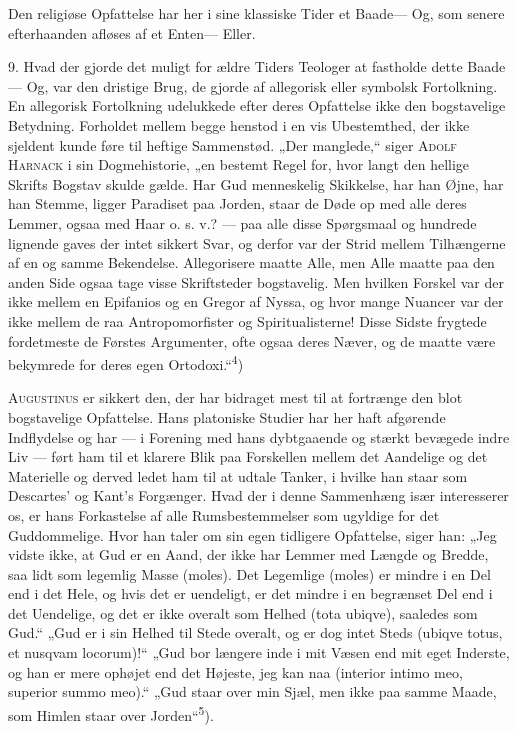 \documentclass[12pt,a4paper,openany]{book}
\newcommand{\opage}[1]{\marginnote{\footnotesize\textit{[#1]}}}
\begin{document}
Den religiøse Opfattelse har her i sine klassiske Tider et Baade--- Og,
som senere efterhaanden afløses af et Enten--- Eller.

9. Hvad der gjorde det muligt for ældre Tiders Teologer at fastholde
dette Baade--- Og, var den dristige Brug, de gjorde af allegorisk eller
symbolsk Fortolkning. En allegorisk Fortolkning udelukkede efter deres
Opfattelse ikke den bogstavelige Betydning. Forholdet mellem begge
henstod i en vis Ubestemthed, der ikke sjeldent kunde føre til heftige
Sammenstød. „Der manglede,“ siger \textsc{Adolf Harnack} i sin
Dogmehistorie, „en bestemt Regel for, hvor langt den hellige Skrifts
Bogstav skulde gælde. Har Gud menneskelig Skikkelse, har han Øjne, har
han Stemme, ligger Paradiset paa Jorden, staar de Døde op med alle deres
Lemmer, ogsaa med Haar o. s. v.? --- paa alle disse Spørgsmaal og
hundrede lignende gaves der intet sikkert Svar, og derfor var der Strid
mellem Tilhængerne af en og samme Bekendelse. Allegorisere maatte Alle,
men Alle maatte paa den anden Side ogsaa tage visse Skriftsteder
bogstavelig. Men hvilken Forskel var der ikke mellem en Epifanios og en
Gregor af Nyssa, og hvor mange Nuancer var der ikke mellem de raa
Antropomorfister og Spiritualisterne! Disse Sidste frygtede fordetmeste
de Førstes Argumenter, ofte ogsaa deres Næver, og de maatte være
bekymrede for deres egen Ortodoxi.“\textsuperscript{4})

\textsc{Augustinus} er sikkert den, der har bidraget mest til at
fortrænge den blot bogstavelige Opfattelse. Hans platoniske Studier har
her haft afgørende Indflydelse og har --- i Forening med hans
dybtgaaende og stærkt bevægede indre Liv --- ført ham til et klarere
Blik paa Forskellen mellem det Aandelige og det Materielle og derved
ledet ham til at udtale Tanker, i hvilke han staar som Descartes’ og
Kant’s Forgænger. Hvad der i denne Sammenhæng især interesserer os, er
hans Forkastelse af alle Rumsbestemmelser som ugyldige for det
Guddommelige. Hvor han taler om sin egen
\opage{27}tidligere Opfattelse, siger han: „Jeg vidste ikke, at Gud er
en Aand, der ikke har Lemmer med Længde og Bredde, saa lidt som legemlig
Masse (moles). Det Legemlige (moles) er mindre i en Del end i det Hele,
og hvis det er uendeligt, er det mindre i en begrænset Del end i det
Uendelige, og det er ikke overalt som Helhed (tota ubiqve), saaledes som
Gud.“ „Gud er i sin Helhed til Stede overalt, og er dog intet Steds
(ubiqve totus, et nusqvam locorum)!“ „Gud bor længere inde i mit Væsen
end mit eget Inderste, og han er mere ophøjet end det Højeste, jeg kan
naa (interior intimo meo, superior summo meo).“ „Gud staar over min
Sjæl, men ikke paa samme Maade, som Himlen staar over
Jorden“\textsuperscript{5}).
\end{document}
